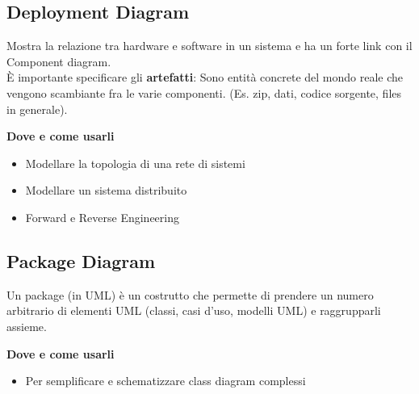 \break
\subsection{Deployment Diagram}
Mostra la relazione tra hardware e software in un sistema e ha un forte link con il Component diagram.\\
\`E importante specificare gli \textbf{artefatti}: Sono entità concrete del mondo reale che vengono scambiante fra le varie componenti. (Es. zip, dati, codice sorgente, files in generale).

\vspace{2mm}
\noindent \textbf{Dove e come usarli}
\begin{itemize}
    \item Modellare la topologia di una rete di sistemi
    \item Modellare un sistema distribuito
    \item Forward e Reverse Engineering
\end{itemize}

\subsection{Package Diagram}
Un package (in UML) è un costrutto che permette di prendere un numero arbitrario di elementi UML (classi, casi d’uso, modelli UML) e raggrupparli assieme.

\vspace{2mm}
\noindent \textbf{Dove e come usarli}
\begin{itemize}
    \item Per semplificare e schematizzare class diagram complessi
\end{itemize}
